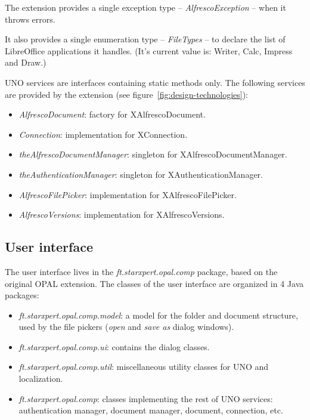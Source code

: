 The extension provides a single exception type -- \emph{AlfrescoException} --
when it throws errors.

It also provides a single enumeration type -- \emph{FileTypes} -- to declare
the list of LibreOffice applications it handles. (It's current value is:
Writer, Calc, Impress and Draw.)

UNO services are interfaces containing static methods only.  The following
services are provided by the extension (see figure~\ref{fig:design-technologies}):

\begin{itemize}
\item \emph{AlfrescoDocument}: factory for XAlfrescoDocument.
\item \emph{Connection}: implementation for XConnection.
\item \emph{theAlfrescoDocumentManager}: singleton for XAlfrescoDocumentManager.
\item \emph{theAuthenticationManager}: singleton for XAuthenticationManager.
\item \emph{AlfrescoFilePicker}: implementation for XAlfrescoFilePicker.
\item \emph{AlfrescoVersions}: implementation for XAlfrescoVersions.
\end{itemize}

\subsection{User interface}

The user interface lives in the \emph{ft.starxpert.opal.comp} package, based on
the original OPAL extension. The classes of the user interface are organized in
4 Java packages:

\begin{itemize}
\item \emph{ft.starxpert.opal.comp.model}: a model for the folder and document
structure, used by the file pickers (\emph{open} and \emph{save as} dialog
windows).
\item \emph{ft.starxpert.opal.comp.ui}: contains the dialog classes.
\item \emph{ft.starxpert.opal.comp.util}: miscellaneous utility classes for UNO and localization.
\item \emph{ft.starxpert.opal.comp}: classes implementing the rest of UNO
services: authentication manager, document manager, document, connection, etc.
\end{itemize}

